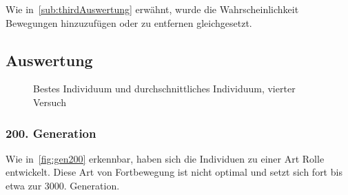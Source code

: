       Wie in~\vref{sub:thirdAuswertung} erwähnt,
      wurde die Wahrscheinlichkeit Bewegungen hinzuzufügen oder zu entfernen gleichgesetzt.


    \subsection{Auswertung}

      \begin{figure}[H]
        \centering
        
        \caption{Bestes Individuum und durchschnittliches Individuum, vierter Versuch\label{fig:graphFourth}}
      \end{figure}

      \subsubsection{200. Generation}

        Wie in~\vref{fig:gen200} erkennbar, haben sich die Individuen zu einer Art Rolle entwickelt.
        Diese Art von Fortbewegung ist nicht optimal und setzt sich fort bis etwa zur 3000. Generation.


        \vspace{0.5cm}

